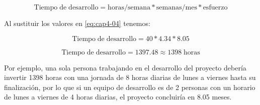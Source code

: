 \begin{equation} \label{eq:cap4-04}
	\mathrm{Tiempo\; de\; desarrollo} =  \mathrm{horas/semana} * \mathrm{semanas/mes} * \mathrm{esfuerzo}
\end{equation}

Al sustituir los valores en \eqref{eq:cap4-04} tenemos:


\begin{equation} \label{eq:cap4-05}
	\mathrm{Tiempo\; de\; desarrollo} =  40 * 4.34 * 8.05
\end{equation}

\begin{equation} \label{eq:cap4-05}
	\mathrm{Tiempo\; de\; desarrollo} =  1397.48 \approx 1398\;  \mathrm{horas}
\end{equation}





Por ejemplo, una sola persona trabajando en el desarrollo del proyecto debería invertir 1398 horas con una jornada de 8 horas diarias de lunes a viernes hasta su finalización, por lo que si un equipo de desarrollo es de 2 personas con un horario de lunes a viernes de 4 horas diarias, el proyecto concluiría en 8.05 meses.

